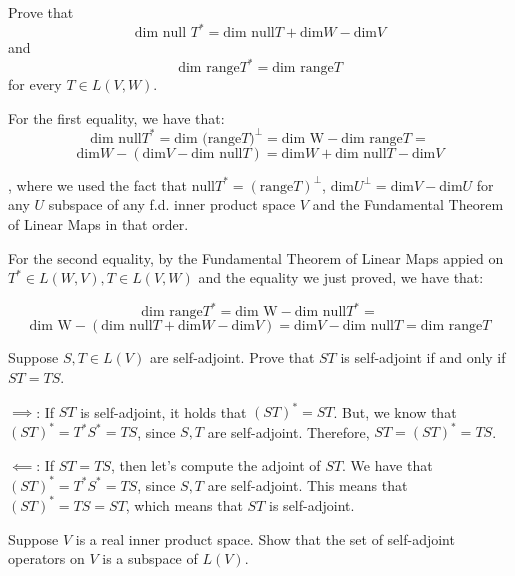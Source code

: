 \begin{exercise}{5}
    Prove that
    $$\text{dim null } T^* = \text{dim null} T + \text{dim} W - \text{dim} V$$
    and
    $$ \text{dim range} T^* = \text{dim range} T$$
    for every $T \in L(V, W)$.
\end{exercise}

\begin{solution}

    For the first equality, we have that:
    $$ \text{dim null} T^* = \text{dim (range} T)^\bot = \text{dim W} - \text{dim range} T = $$
    $$\text{dim} W - (\text{dim} V - \text{dim null} T) = \text{dim} W + \text{dim null} T - \text{dim} V$$

    , where we used the fact that $\text{null} T^* = (\text{range} T)^\bot$, $\text{dim} U^\bot = \text{dim} V - \text{dim} U$ for any $U$ subspace of any f.d. inner product space $V$ and the Fundamental Theorem of Linear Maps in that order.

    For the second equality, by the Fundamental Theorem of Linear Maps appied on $T^* \in L(W, V), T \in L(V, W)$ and the equality we just proved, we have that:

    $$\text{dim range} T^* = \text{dim W} - \text{dim null} T^* = $$
    $$\text{dim W} - (\text{dim null} T + \text{dim} W - \text{dim} V) = \text{dim} V - \text{dim null} T = \text{dim range} T$$
\end{solution}

\begin{exercise}{7}
    Suppose $S, T \in L(V)$ are self-adjoint. Prove that $ST$ is self-adjoint if and only if $ST = TS$.
\end{exercise}

\begin{solution}

    $\implies$: If $ST$ is self-adjoint, it holds that $(ST)^* = ST$. But, we know that $(ST)^* = T^*S^* = TS$, since $S, T$ are self-adjoint. Therefore, $ST = (ST)^* = TS$.

    $\impliedby$: If $ST = TS$, then let's compute the adjoint of $ST$. We have that $(ST)^* = T^*S^* = TS$, since $S, T$ are self-adjoint. This means that $(ST)^* = TS = ST$, which means that $ST$ is self-adjoint.
\end{solution}

\begin{exercise}{8}
    Suppose $V$ is a real inner product space. Show that the set of self-adjoint operators on $V$ is a subspace of $L(V)$.
\end{exercise}

